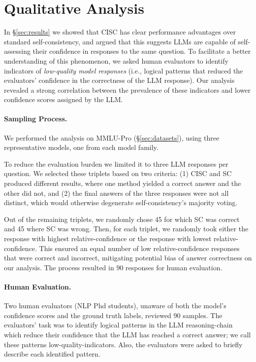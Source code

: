 \section{Qualitative Analysis}
\label{sec:qualitative}


In \S\ref{sec:results} we showed that CISC has clear 
performance advantages over standard self-consistency, and argued that this suggests LLMs are capable of self-assessing their confidence in responses to the same question. To facilitate a better understanding of this phenomenon, we asked human evaluators to identify indicators of \emph{low-quality model responses} (i.e., logical patterns that reduced the evaluators' confidence in the correctness of the LLM response). Our analysis revealed a strong correlation between the prevalence of these indicators and lower confidence scores assigned by the LLM.

\paragraph{Sampling Process.} We performed the analysis on MMLU-Pro (\S\ref{sec:datasets}), using three representative models, one from each model family.  

To reduce the evaluation burden we limited it to three LLM responses per question. We selected these triplets based on two criteria: (1) CISC and SC produced different results, where one method yielded a correct answer and the other did not, and (2) the final answers of the three responses were not all distinct, which would otherwise degenerate self-consistency's majority voting. 

Out of the remaining triplets, we randomly chose 45 for which SC was correct and 45 where SC was wrong. Then, for each triplet, we randomly took either the response with highest relative-confidence or the response with lowest relative-confidence. This ensured an equal number of low relative-confidence responses that were correct and incorrect, mitigating potential bias of answer correctness on our analysis. The process resulted in 90 responses for human evaluation.

\paragraph{Human Evaluation.} Two human evaluators (NLP Phd students), unaware of both the model's confidence scores and the ground truth labels, reviewed 90 samples. The evaluators' task was to identify logical patterns in the LLM reasoning-chain which reduce their confidence that the LLM has reached a correct answer; we call these patterns low-quality-indicators. Also, the evaluators were asked to briefly describe each identified pattern.

